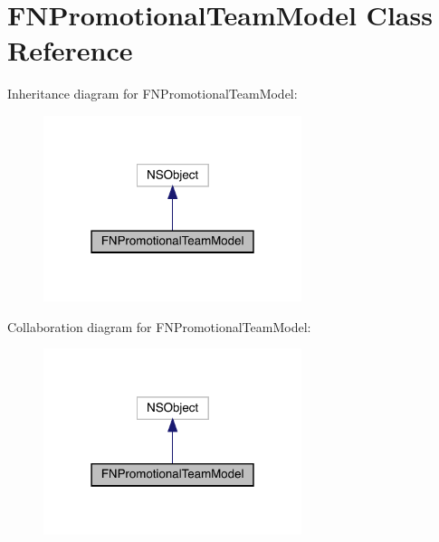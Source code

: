 \hypertarget{interface_f_n_promotional_team_model}{}\section{F\+N\+Promotional\+Team\+Model Class Reference}
\label{interface_f_n_promotional_team_model}


Inheritance diagram for F\+N\+Promotional\+Team\+Model\+:\nopagebreak
\begin{figure}[H]
\begin{center}
\leavevmode
\includegraphics[width=214pt]{interface_f_n_promotional_team_model__inherit__graph}
\end{center}
\end{figure}


Collaboration diagram for F\+N\+Promotional\+Team\+Model\+:\nopagebreak
\begin{figure}[H]
\begin{center}
\leavevmode
\includegraphics[width=214pt]{interface_f_n_promotional_team_model__coll__graph}
\end{center}
\end{figure}
